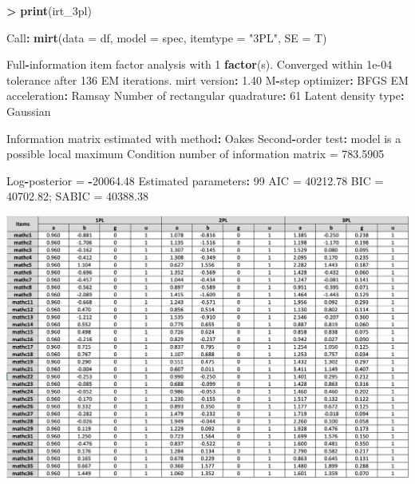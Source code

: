 \documentclass[
]{article}
\newenvironment{Shaded}{\begin{snugshade}}{\end{snugshade}}
\newcommand{\AttributeTok}[1]{\textcolor[rgb]{0.13,0.29,0.53}{#1}}
\newcommand{\DecValTok}[1]{\textcolor[rgb]{0.00,0.00,0.81}{#1}}
\newcommand{\FloatTok}[1]{\textcolor[rgb]{0.00,0.00,0.81}{#1}}
\newcommand{\FunctionTok}[1]{\textcolor[rgb]{0.13,0.29,0.53}{\textbf{#1}}}
\newcommand{\NormalTok}[1]{#1}
\newcommand{\OtherTok}[1]{\textcolor[rgb]{0.56,0.35,0.01}{#1}}
\newcommand{\SpecialCharTok}[1]{\textcolor[rgb]{0.81,0.36,0.00}{\textbf{#1}}}
\newcommand{\StringTok}[1]{\textcolor[rgb]{0.31,0.60,0.02}{#1}}
\begin{document}
\begin{Shaded}
\begin{Highlighting}[]
\SpecialCharTok{\textgreater{}} \FunctionTok{print}\NormalTok{(irt\_3pl)}

\NormalTok{Call}\SpecialCharTok{:}
\FunctionTok{mirt}\NormalTok{(}\AttributeTok{data =}\NormalTok{ df, }\AttributeTok{model =}\NormalTok{ spec, }\AttributeTok{itemtype =} \StringTok{"3PL"}\NormalTok{, }\AttributeTok{SE =}\NormalTok{ T)}

\NormalTok{Full}\SpecialCharTok{{-}}\NormalTok{information item factor analysis with }\DecValTok{1} \FunctionTok{factor}\NormalTok{(s).}
\NormalTok{Converged within }\FloatTok{1e{-}04}\NormalTok{ tolerance after }\DecValTok{136}\NormalTok{ EM iterations.}
\NormalTok{mirt version}\SpecialCharTok{:} \FloatTok{1.40} 
\NormalTok{M}\SpecialCharTok{{-}}\NormalTok{step optimizer}\SpecialCharTok{:}\NormalTok{ BFGS }
\NormalTok{EM acceleration}\SpecialCharTok{:}\NormalTok{ Ramsay }
\NormalTok{Number of rectangular quadrature}\SpecialCharTok{:} \DecValTok{61}
\NormalTok{Latent density type}\SpecialCharTok{:}\NormalTok{ Gaussian }

\NormalTok{Information matrix estimated with method}\SpecialCharTok{:}\NormalTok{ Oakes}
\NormalTok{Second}\SpecialCharTok{{-}}\NormalTok{order test}\SpecialCharTok{:}\NormalTok{ model is a possible local maximum}
\NormalTok{Condition number of information matrix }\OtherTok{=}  \FloatTok{783.5905}

\NormalTok{Log}\SpecialCharTok{{-}}\NormalTok{posterior }\OtherTok{=} \SpecialCharTok{{-}}\FloatTok{20064.48}
\NormalTok{Estimated parameters}\SpecialCharTok{:} \DecValTok{99} 
\NormalTok{AIC }\OtherTok{=} \FloatTok{40212.78}
\NormalTok{BIC }\OtherTok{=} \FloatTok{40702.82}\NormalTok{; SABIC }\OtherTok{=} \FloatTok{40388.38}
\end{Highlighting}
\end{Shaded}

\includegraphics{all_estimated_items.png}
\end{document}

